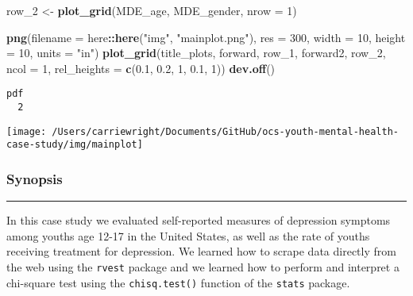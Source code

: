 \documentclass[
]{article}
\newenvironment{Shaded}{\begin{snugshade}}{\end{snugshade}}
\newcommand{\DataTypeTok}[1]{\textcolor[rgb]{0.13,0.29,0.53}{#1}}
\newcommand{\DecValTok}[1]{\textcolor[rgb]{0.00,0.00,0.81}{#1}}
\newcommand{\FloatTok}[1]{\textcolor[rgb]{0.00,0.00,0.81}{#1}}
\newcommand{\KeywordTok}[1]{\textcolor[rgb]{0.13,0.29,0.53}{\textbf{#1}}}
\newcommand{\NormalTok}[1]{#1}
\newcommand{\OperatorTok}[1]{\textcolor[rgb]{0.81,0.36,0.00}{\textbf{#1}}}
\newcommand{\StringTok}[1]{\textcolor[rgb]{0.31,0.60,0.02}{#1}}
\begin{document}
\begin{Shaded}
\begin{Highlighting}[]
\NormalTok{row_}\DecValTok{2}\NormalTok{ <-}\StringTok{ }\KeywordTok{plot_grid}\NormalTok{(MDE_age, MDE_gender,}
                   \DataTypeTok{nrow =} \DecValTok{1}\NormalTok{)}

\KeywordTok{png}\NormalTok{(}\DataTypeTok{filename =}\NormalTok{ here}\OperatorTok{::}\KeywordTok{here}\NormalTok{(}\StringTok{"img"}\NormalTok{, }\StringTok{"mainplot.png"}\NormalTok{), }
         \DataTypeTok{res =} \DecValTok{300}\NormalTok{, }\DataTypeTok{width =} \DecValTok{10}\NormalTok{, }\DataTypeTok{height =} \DecValTok{10}\NormalTok{, }\DataTypeTok{units =} \StringTok{"in"}\NormalTok{)}
\KeywordTok{plot_grid}\NormalTok{(title_plots, }
\NormalTok{          forward,}
\NormalTok{          row_}\DecValTok{1}\NormalTok{,}
\NormalTok{          forward2,}
\NormalTok{          row_}\DecValTok{2}\NormalTok{,}
          \DataTypeTok{ncol =} \DecValTok{1}\NormalTok{, }
          \DataTypeTok{rel_heights =} \KeywordTok{c}\NormalTok{(}\FloatTok{0.1}\NormalTok{, }\FloatTok{0.2}\NormalTok{, }\DecValTok{1}\NormalTok{, }\FloatTok{0.1}\NormalTok{, }\DecValTok{1}\NormalTok{))}
\KeywordTok{dev.off}\NormalTok{()}
\end{Highlighting}
\end{Shaded}

\begin{verbatim}
pdf 
  2 
\end{verbatim}

\begin{center}\texttt{[image: /Users/carriewright/Documents/GitHub/ocs-youth-mental-health-case-study/img/mainplot]} \end{center}

\hypertarget{synopsis}{%
\subsubsection{\texorpdfstring{\textbf{Synopsis}}{Synopsis}}\label{synopsis}}

\begin{center}\rule{0.5\linewidth}{0.5pt}\end{center}

In this case study we evaluated self-reported measures of depression
symptoms among youths age 12-17 in the United States, as well as the
rate of youths receiving treatment for depression. We learned how to
scrape data directly from the web using the \texttt{rvest} package and
we learned how to perform and interpret a chi-square test using the
\texttt{chisq.test()} function of the \texttt{stats} package.
\end{document}
